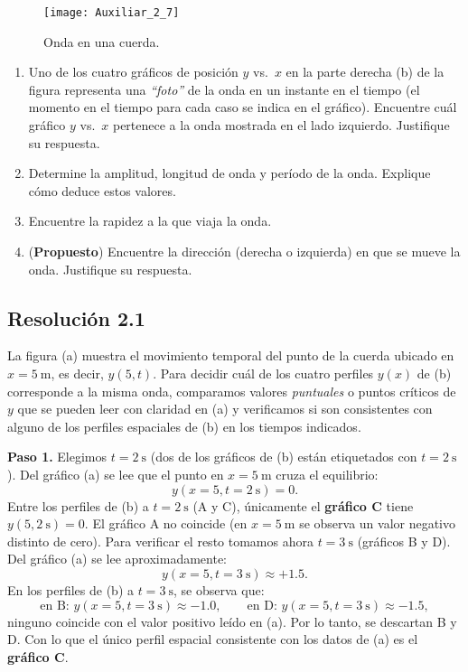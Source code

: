 \documentclass[
  11pt,
  letterpaper,
   addpoints,
  ]{exam}
\begin{document}
\begin{questions}
  \begin{figure}[H]
    \centering
    \texttt{[image: Auxiliar\_2\_7]}
    \caption{Onda en una cuerda.}
  \label{fig:wave_string}
  \end{figure}
\begin{enumerate}
  \item Uno de los cuatro gráficos de posición $y$ vs.\ $x$ en la parte derecha (b) de la figura representa una \emph{“foto”} de la onda en un instante en el tiempo (el momento en el tiempo para cada caso se indica en el gráfico). Encuentre cuál gráfico $y$ vs.\ $x$ pertenece a la onda mostrada en el lado izquierdo. Justifique su respuesta.

  \item Determine la amplitud, longitud de onda y período de la onda. Explique cómo deduce estos valores.

  \item Encuentre la rapidez a la que viaja la onda.

  \item (\textbf{Propuesto}) Encuentre la dirección (derecha o izquierda) en que se mueve la onda. Justifique su respuesta.
\end{enumerate}
\begin{solution}
\subsection*{Resolución 2.1}

La figura (a) muestra el movimiento temporal del punto de la cuerda ubicado en $x=5~\text{m}$, es decir, $y(5,t)$. Para decidir cuál de los cuatro perfiles $y(x)$ de (b) corresponde a la misma onda, comparamos valores \textit{puntuales} o puntos críticos de $y$ que se pueden leer con claridad en (a) y verificamos si son consistentes con alguno de los perfiles espaciales de (b) en los tiempos indicados.

\medskip
	\textbf{Paso 1.} Elegimos $t=2~\text{s}$ (dos de los gráficos de (b) están etiquetados con $t=2~\text{s}$). Del gráfico (a) se lee que el punto en $x=5~\text{m}$ cruza el equilibrio:
\begin{equation}
y(x=5,t=2~\text{s}) = 0.
\end{equation}
Entre los perfiles de (b) a $t=2~\text{s}$ (A y C), únicamente el \textbf{gráfico C} tiene $y(5,2~\text{s})=0$. El gráfico A no coincide (en $x=5~\text{m}$ se observa un valor negativo distinto de cero). Para verificar el resto tomamos ahora $t=3~\text{s}$ (gráficos B y D). Del gráfico (a) se lee aproximadamente:
\begin{equation}
y(x=5,t=3~\text{s}) \approx +1.5.
\end{equation}
En los perfiles de (b) a $t=3~\text{s}$, se observa que:
\begin{equation}
\text{en B: } y(x=5,t=3~\text{s})\approx -1.0, 
\qquad
\text{en D: } y(x=5,t=3~\text{s})\approx -1.5,
\end{equation}
ninguno coincide con el valor positivo leído en (a). Por lo tanto, se descartan B y D. Con lo que el único perfil espacial consistente con los datos de (a) es el \textbf{gráfico C}.


\end{solution}
\end{questions}
\end{document}
